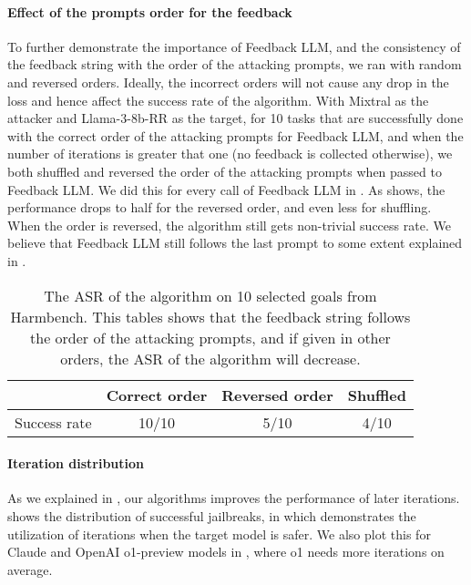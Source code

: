 \paragraph{Effect of the prompts order for the feedback} To further demonstrate the importance of Feedback LLM, and the consistency of the feedback string with the order of the attacking prompts, we ran  with random and reversed orders. Ideally, the incorrect orders will not cause any drop in the loss and hence affect the success rate of the algorithm. With Mixtral as the attacker and Llama-3-8b-RR as the target, for 10 tasks that are successfully done with the correct order of the attacking prompts for Feedback LLM, and when the number of iterations is greater that one (no feedback is collected otherwise), we both shuffled and reversed the order of the attacking prompts when passed to Feedback LLM. We did this for every call of Feedback LLM in . As  shows, the performance drops to half for the reversed order, and even less for shuffling. When the order is reversed, the algorithm still gets non-trivial success rate. We believe that Feedback LLM still follows the last prompt to some extent explained in .

\begin{table}[h!]
    \centering
    
    \begin{tabular}{lccc}
    \toprule
    & Correct order & Reversed order & Shuffled \\
    \midrule
    Success rate & 10/10&  5/10& 4/10\\
    \bottomrule
    \end{tabular}
    \caption{The ASR of the algorithm on 10 selected goals from Harmbench. This tables shows that the feedback string follows the order of the attacking prompts, and if given in other orders, the ASR of the algorithm will decrease.} 
    \label{table_orders} 
\end{table}


\paragraph{Iteration distribution} As we explained in , our algorithms improves the performance of later iterations.  shows the distribution of successful jailbreaks, in which  demonstrates the utilization of iterations when the target model is safer. We also plot this for Claude and OpenAI o1-preview models in , where o1 needs more iterations on average. 

